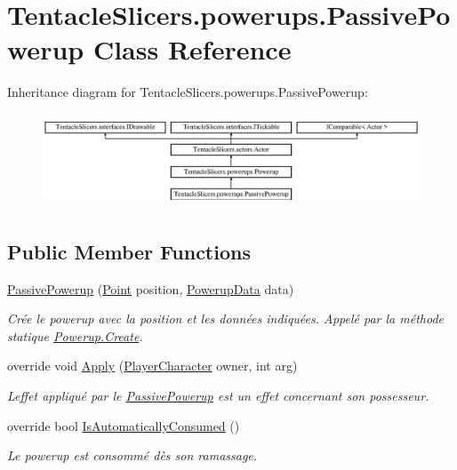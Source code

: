 \hypertarget{class_tentacle_slicers_1_1powerups_1_1_passive_powerup}{}\section{Tentacle\+Slicers.\+powerups.\+Passive\+Powerup Class Reference}
\label{class_tentacle_slicers_1_1powerups_1_1_passive_powerup}
Inheritance diagram for Tentacle\+Slicers.\+powerups.\+Passive\+Powerup\+:\begin{figure}[H]
\begin{center}
\leavevmode
\includegraphics[height=2.828283cm]{class_tentacle_slicers_1_1powerups_1_1_passive_powerup}
\end{center}
\end{figure}
\subsection*{Public Member Functions}
\begin{DoxyCompactItemize}
\item 
\hyperlink{class_tentacle_slicers_1_1powerups_1_1_passive_powerup_abf4b681f1941b297fb4a4d5d943b5a71}{Passive\+Powerup} (\hyperlink{class_tentacle_slicers_1_1general_1_1_point}{Point} position, \hyperlink{class_tentacle_slicers_1_1powerups_1_1_powerup_data}{Powerup\+Data} data)
\begin{DoxyCompactList}\small\item\em Crée le powerup avec la position et les données indiquées. Appelé par la méthode statique \hyperlink{class_tentacle_slicers_1_1powerups_1_1_powerup_a9aecde45bf218c2241b7454235e68050}{Powerup.\+Create}. \end{DoxyCompactList}\item 
override void \hyperlink{class_tentacle_slicers_1_1powerups_1_1_passive_powerup_a362a58a946f2d33b4aeef20ce605c8f9}{Apply} (\hyperlink{class_tentacle_slicers_1_1actors_1_1_player_character}{Player\+Character} owner, int arg)
\begin{DoxyCompactList}\small\item\em L\textquotesingle{}effet appliqué par le \hyperlink{class_tentacle_slicers_1_1powerups_1_1_passive_powerup}{Passive\+Powerup} est un effet concernant son possesseur. \end{DoxyCompactList}\item 
override bool \hyperlink{class_tentacle_slicers_1_1powerups_1_1_passive_powerup_ae6f8556eac0226913c40d83358b385d0}{Is\+Automatically\+Consumed} ()
\begin{DoxyCompactList}\small\item\em Le powerup est consommé dès son ramassage. \end{DoxyCompactList}\end{DoxyCompactItemize}
